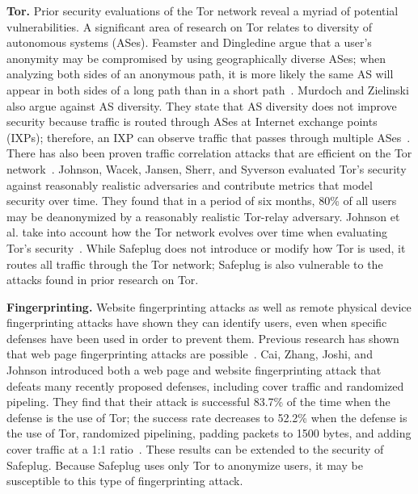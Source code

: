 \documentclass[conference]{IEEEtran}
\begin{document}
{\bf Tor.} Prior security evaluations of the Tor network reveal a myriad of potential vulnerabilities.  A significant area of research on Tor relates to diversity of autonomous systems (ASes).  Feamster and Dingledine argue that a user's anonymity may be compromised by using geographically diverse ASes; when analyzing both sides of an anonymous path, it is more likely the same AS will appear in both sides of a long path than in a short path~\cite{feamster}.  Murdoch and Zielinski also argue against AS diversity.  They state that AS diversity does not improve security because traffic is routed through ASes at Internet exchange points (IXPs); therefore, an IXP can observe traffic that passes through multiple ASes~\cite{murdoch2}.  There has also been proven traffic correlation attacks that are efficient on the Tor network~\cite{murdoch, overlier}.  Johnson, Wacek, Jansen, Sherr, and Syverson evaluated Tor's security against reasonably realistic adversaries and contribute metrics that model security over time.  They found that in a period of six months, 80\% of all users may be deanonymized by a reasonably realistic Tor-relay adversary.  Johnson et al. take into account how the Tor network evolves over time when evaluating Tor's security~\cite{tor2}.  While Safeplug does not introduce or modify how Tor is used, it routes all traffic through the Tor network; Safeplug is also vulnerable to the attacks found in prior research on Tor.  

{\bf Fingerprinting.}  Website fingerprinting attacks as well as remote physical device fingerprinting attacks have shown they can identify users, even when specific defenses have been used in order to prevent them. Previous research has shown that web page fingerprinting attacks are possible~\cite{dyer, herrmann, panchenko}.  Cai, Zhang, Joshi, and Johnson introduced both a web page and website fingerprinting attack that defeats many recently proposed defenses, including cover traffic and randomized pipeling.  They find that their attack is successful 83.7\% of the time when the defense is the use of Tor; the success rate decreases to 52.2\% when the defense is the use of Tor, randomized pipelining, padding packets to 1500 bytes, and adding cover traffic at a 1:1 ratio~\cite{fingerprint1}.  These results can be extended to the security of Safeplug.  Because Safeplug uses only Tor to anonymize users, it may be susceptible to this type of fingerprinting attack.

\end{document}
